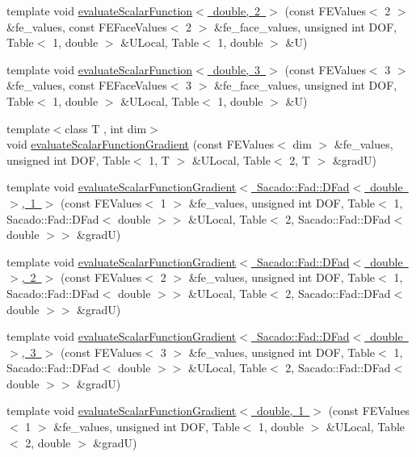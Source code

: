 \begin{DoxyCompactItemize}
\item 
template void \mbox{\hyperlink{function_evaluations_8cc_a9d228a6175fb599a42cf7a0721ad2f32}{evaluate\+Scalar\+Function$<$ double, 2 $>$}} (const F\+E\+Values$<$ 2 $>$ \&fe\+\_\+values, const F\+E\+Face\+Values$<$ 2 $>$ \&fe\+\_\+face\+\_\+values, unsigned int D\+OF, Table$<$ 1, double $>$ \&U\+Local, Table$<$ 1, double $>$ \&U)
\item 
template void \mbox{\hyperlink{function_evaluations_8cc_ab0361b7dabb7d8e4edf83632ddb3129c}{evaluate\+Scalar\+Function$<$ double, 3 $>$}} (const F\+E\+Values$<$ 3 $>$ \&fe\+\_\+values, const F\+E\+Face\+Values$<$ 3 $>$ \&fe\+\_\+face\+\_\+values, unsigned int D\+OF, Table$<$ 1, double $>$ \&U\+Local, Table$<$ 1, double $>$ \&U)
\item 
{\footnotesize template$<$class T , int dim$>$ }\\void \mbox{\hyperlink{group___evaluation_functions_ga3ee6127c2c5c8333bb7fb384dcdb431f}{evaluate\+Scalar\+Function\+Gradient}} (const F\+E\+Values$<$ dim $>$ \&fe\+\_\+values, unsigned int D\+OF, Table$<$ 1, T $>$ \&U\+Local, Table$<$ 2, T $>$ \&gradU)
\item 
template void \mbox{\hyperlink{function_evaluations_8cc_ae408f77762afad2daeaa555239d1d38f}{evaluate\+Scalar\+Function\+Gradient$<$ Sacado\+::\+Fad\+::\+D\+Fad$<$ double $>$, 1 $>$}} (const F\+E\+Values$<$ 1 $>$ \&fe\+\_\+values, unsigned int D\+OF, Table$<$ 1, Sacado\+::\+Fad\+::\+D\+Fad$<$ double $>$$>$ \&U\+Local, Table$<$ 2, Sacado\+::\+Fad\+::\+D\+Fad$<$ double $>$$>$ \&gradU)
\item 
template void \mbox{\hyperlink{function_evaluations_8cc_a780341ff23fa9a724797a3963b5eb267}{evaluate\+Scalar\+Function\+Gradient$<$ Sacado\+::\+Fad\+::\+D\+Fad$<$ double $>$, 2 $>$}} (const F\+E\+Values$<$ 2 $>$ \&fe\+\_\+values, unsigned int D\+OF, Table$<$ 1, Sacado\+::\+Fad\+::\+D\+Fad$<$ double $>$$>$ \&U\+Local, Table$<$ 2, Sacado\+::\+Fad\+::\+D\+Fad$<$ double $>$$>$ \&gradU)
\item 
template void \mbox{\hyperlink{function_evaluations_8cc_a612155392eef7fae67e40615ddfce82a}{evaluate\+Scalar\+Function\+Gradient$<$ Sacado\+::\+Fad\+::\+D\+Fad$<$ double $>$, 3 $>$}} (const F\+E\+Values$<$ 3 $>$ \&fe\+\_\+values, unsigned int D\+OF, Table$<$ 1, Sacado\+::\+Fad\+::\+D\+Fad$<$ double $>$$>$ \&U\+Local, Table$<$ 2, Sacado\+::\+Fad\+::\+D\+Fad$<$ double $>$$>$ \&gradU)
\item 
template void \mbox{\hyperlink{function_evaluations_8cc_a778e8b0e56686ca05b7ae735ede7547d}{evaluate\+Scalar\+Function\+Gradient$<$ double, 1 $>$}} (const F\+E\+Values$<$ 1 $>$ \&fe\+\_\+values, unsigned int D\+OF, Table$<$ 1, double $>$ \&U\+Local, Table$<$ 2, double $>$ \&gradU)

\end{DoxyCompactItemize}
